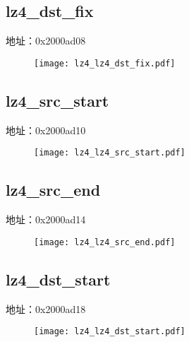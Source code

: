 \subsection{lz4\_dst\_fix}
\label{lz4-lz4-dst-fix}
地址：0x2000ad08
 \begin{figure}[H]
\texttt{[image: lz4\_lz4\_dst\_fix.pdf]}
\end{figure}

\subsection{lz4\_src\_start}
\label{lz4-lz4-src-start}
地址：0x2000ad10
 \begin{figure}[H]
\texttt{[image: lz4\_lz4\_src\_start.pdf]}
\end{figure}

\subsection{lz4\_src\_end}
\label{lz4-lz4-src-end}
地址：0x2000ad14
 \begin{figure}[H]
\texttt{[image: lz4\_lz4\_src\_end.pdf]}
\end{figure}

\subsection{lz4\_dst\_start}
\label{lz4-lz4-dst-start}
地址：0x2000ad18
 \begin{figure}[H]
\texttt{[image: lz4\_lz4\_dst\_start.pdf]}
\end{figure}

